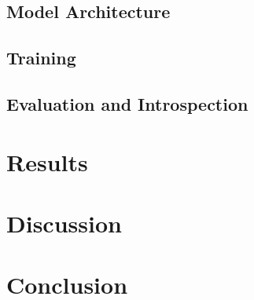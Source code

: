 \documentclass[conference]{IEEEtran}
\begin{document}
\subsection{Model Architecture}


\subsection{Training}


\subsection{Evaluation and Introspection}


\section{Results}


\section{Discussion}


\section{Conclusion}


\break{}

\end{document}
